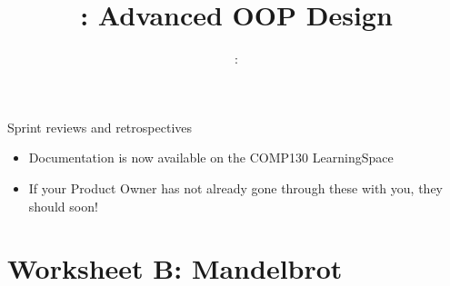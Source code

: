 \usepackage{../../beamerthemeFalmouthGamesAcademy}
\usepackage{multimedia}
\graphicspath{ {../../} }


\usepackage[normalem]{ulem}
\usepackage{wasysym}

\usepackage{pdfpages}

\usetikzlibrary{arrows,automata}




\title{\sessionnumber: Advanced OOP Design}
\subtitle{\modulecode: \moduletitle}

\frame{\titlepage} 


\begin{frame}{Sprint reviews and retrospectives}
	\begin{itemize}
		\pause\item Documentation is now available on the COMP130 LearningSpace
		\pause\item If your Product Owner has not already gone through these with you, they should soon!
	\end{itemize}
\end{frame}





\part{Worksheet B: Mandelbrot}
\frame{\partpage}



